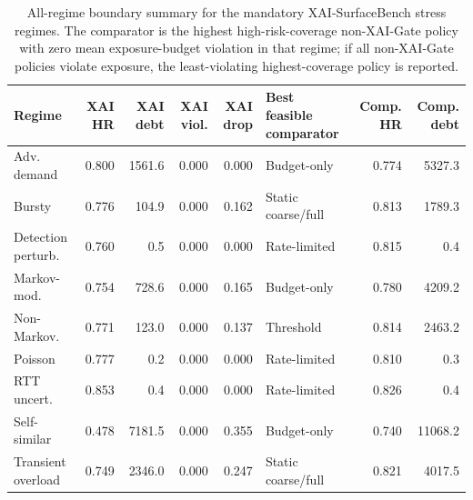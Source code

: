 \begin{table}[t]
\centering
\scriptsize
\caption{All-regime boundary summary for the mandatory XAI-SurfaceBench stress regimes. The comparator is the highest high-risk-coverage non-XAI-Gate policy with zero mean exposure-budget violation in that regime; if all non-XAI-Gate policies violate exposure, the least-violating highest-coverage policy is reported.}
\label{tab:all_regime_boundary}
\begin{tabular}{@{}lrrrrlrr@{}}
\toprule
Regime & XAI HR & XAI debt & XAI viol. & XAI drop & Best feasible comparator & Comp. HR & Comp. debt \\
\midrule
Adv. demand & 0.800 & 1561.6 & 0.000 & 0.000 & Budget-only & 0.774 & 5327.3 \\
Bursty & 0.776 & 104.9 & 0.000 & 0.162 & Static coarse/full & 0.813 & 1789.3 \\
Detection perturb. & 0.760 & 0.5 & 0.000 & 0.000 & Rate-limited & 0.815 & 0.4 \\
Markov-mod. & 0.754 & 728.6 & 0.000 & 0.165 & Budget-only & 0.780 & 4209.2 \\
Non-Markov. & 0.771 & 123.0 & 0.000 & 0.137 & Threshold & 0.814 & 2463.2 \\
Poisson & 0.777 & 0.2 & 0.000 & 0.000 & Rate-limited & 0.810 & 0.3 \\
RTT uncert. & 0.853 & 0.4 & 0.000 & 0.000 & Rate-limited & 0.826 & 0.4 \\
Self-similar & 0.478 & 7181.5 & 0.000 & 0.355 & Budget-only & 0.740 & 11068.2 \\
Transient overload & 0.749 & 2346.0 & 0.000 & 0.247 & Static coarse/full & 0.821 & 4017.5 \\
\bottomrule
\end{tabular}
\end{table}
